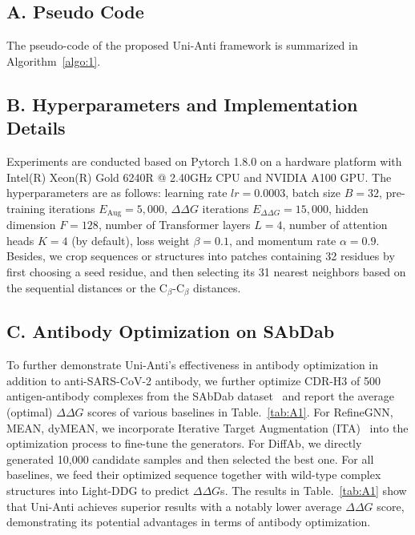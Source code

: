 \renewcommand\thefigure{A\arabic{figure}}
\renewcommand\thetable{A\arabic{table}}
\setcounter{table}{0}
\setcounter{figure}{0}
\renewcommand{\dblfloatpagefraction}{.95}


\subsection*{A. Pseudo Code}
The pseudo-code of the proposed Uni-Anti framework is summarized in Algorithm~\ref{algo:1}.




\subsection*{B. Hyperparameters and Implementation Details}
Experiments are conducted based on Pytorch 1.8.0 on a hardware platform with Intel(R) Xeon(R) Gold 6240R @ 2.40GHz CPU and NVIDIA A100 GPU. The hyperparameters are as follows: learning rate $lr=0.0003$, batch size $B=32$, pre-training iterations $E_{\text{Aug}}=5,000$, $\Delta\Delta G$ iterations $E_{\Delta\Delta G}=15,000$, hidden dimension $F=128$, number of Transformer layers $L=4$, number of attention heads $K=4$ (by default), loss weight $\beta=0.1$, and momentum rate $\alpha=0.9$. Besides, we crop sequences or structures into patches containing 32 residues by first choosing a seed residue, and then selecting its 31 nearest neighbors based on the sequential distances or the C$_\beta$-C$_\beta$ distances. 


\subsection*{C. Antibody Optimization on SAbDab}
To further demonstrate Uni-Anti's effectiveness in antibody optimization in addition to anti-SARS-CoV-2 antibody, we further optimize CDR-H3 of 500 antigen-antibody complexes from the SAbDab dataset~\citep{dunbar2014sabdab} and report the average (optimal) $\Delta\Delta G$ scores of various baselines in Table.~\ref{tab:A1}. For RefineGNN, MEAN, dyMEAN, we incorporate Iterative Target Augmentation (ITA)~\citep{yang2020improving} into the optimization process to fine-tune the generators. For DiffAb, we directly generated 10,000 candidate samples and then selected the best one. For all baselines, we feed their optimized sequence together with wild-type complex structures into Light-DDG to predict $\Delta\Delta G$s. The results in Table.~\ref{tab:A1} show that Uni-Anti achieves superior results with a notably lower average $\Delta\Delta G$ score, demonstrating its potential advantages in terms of antibody optimization.

